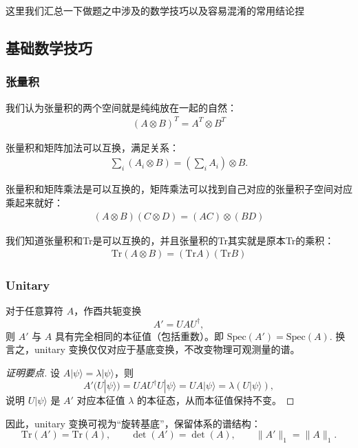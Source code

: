 这里我们汇总一下做题之中涉及的数学技巧以及容易混淆的常用结论捏
\subsection{基础数学技巧}

\subsubsection{张量积}

\bigskip
{}

我们认为张量积的两个空间就是纯纯放在一起的自然：
\begin{align}
  (A\otimes B)^T=A^T\otimes B^T
\end{align}

\bigskip
{}

张量积和矩阵加法可以互换，满足关系：
\begin{align}
  \sum_i(A_i\otimes B)=\left(\sum_iA_i\right)\otimes B.
\end{align}

\bigskip
{}

张量积和矩阵乘法是可以互换的，矩阵乘法可以找到自己对应的张量积子空间对应乘起来就好：
\begin{align}
  (A\otimes B)(C\otimes D)=(AC)\otimes(BD)
\end{align}

\bigskip
{}

\bigskip
{}

我们知道张量积和Tr是可以互换的，并且张量积的Tr其实就是原本Tr的乘积：
\begin{align}
  \mathrm{Tr}(A\otimes B)=(\mathrm{Tr}A)\left(\mathrm{Tr}B\right)
\end{align}

\subsubsection{Unitary}

\bigskip
{}

对于任意算符 $A$，作酉共轭变换
\begin{equation}
  A' = U A U^\dagger,
\end{equation}
则 $A'$ 与 $A$ 具有完全相同的本征值（包括重数）。即
$ \mathrm{Spec}(A') = \mathrm{Spec}(A).$
换言之，unitary 变换仅仅对应于基底变换，不改变物理可观测量的谱。
\begin{proof}[证明要点]
  设 $A|\psi\rangle = \lambda|\psi\rangle$，则
  \begin{equation}
    A'(U|\psi\rangle)
    = UAU^\dagger U|\psi\rangle
    = UA|\psi\rangle
    = \lambda (U|\psi\rangle),
  \end{equation}
  说明 $U|\psi\rangle$ 是 $A'$ 对应本征值 $\lambda$ 的本征态，从而本征值保持不变。
\end{proof}
因此，unitary 变换可视为``旋转基底''，保留体系的谱结构：
\begin{equation}
  \mathrm{Tr}(A') = \mathrm{Tr}(A),\qquad
  \det(A') = \det(A),\qquad
  \|A'\|_1 = \|A\|_1.
\end{equation}

